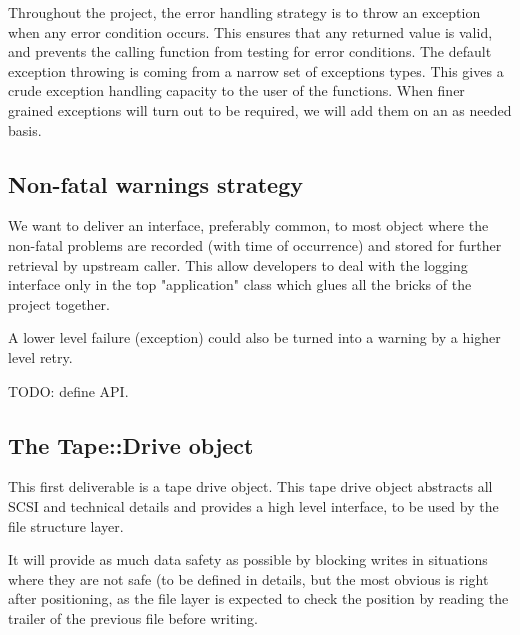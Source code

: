 Throughout the project, the error handling strategy is to throw an exception when any
error condition occurs. This ensures that any returned value is valid, and prevents the 
calling function from testing for error conditions. The default exception throwing is
coming from a narrow set of exceptions types. This gives a crude exception handling capacity
to the user of the functions. When finer grained exceptions will turn out to be required,
we will add them on an as needed basis.

\subsection{Non-fatal warnings strategy}
\label{Non-fatal warnings strategy}


We want to deliver an interface, preferably common, to most object where the non-fatal
problems are recorded (with time of occurrence) and stored for further retrieval by
upstream caller. This allow developers to deal with the logging interface only in the 
top "application" class which glues all the bricks of the project together.

A lower level failure (exception) could also be turned into a warning by a higher level
retry.

TODO: define API.

\subsection{The Tape::Drive object}

This first deliverable is a tape drive object. This tape drive object abstracts all
SCSI and technical details and provides a high level interface, to be used by the 
file structure layer.

It will provide as much data safety as possible by blocking writes in situations
where they are not safe (to be defined in details, but the most obvious is right
after positioning, as the file layer is expected to check the position by reading
the trailer of the previous file before writing.

